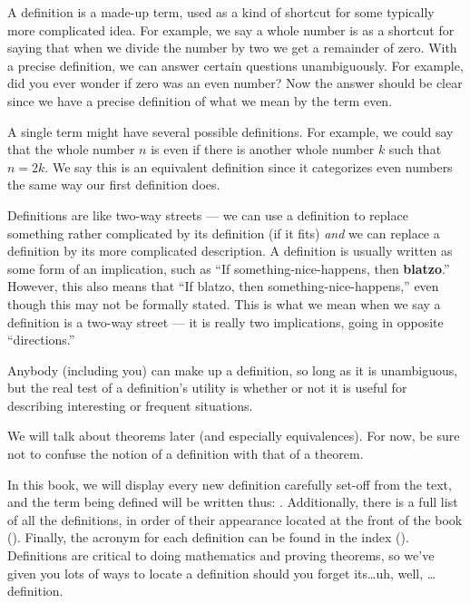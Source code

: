 \begin{para}A definition is a made-up term, used as a kind of shortcut for some typically more complicated idea.  For example, we say a whole number is  as a shortcut for saying that when we divide the number by two we get a remainder of zero.  With a precise definition, we can answer certain questions unambiguously.  For example, did you ever wonder if zero was an even number?  Now the answer should be clear since we have a precise definition of what we mean by the term even.\end{para}
%
\begin{para}A single term might have several possible definitions.  For example, we could say that the whole number $n$ is even if there is another whole number $k$ such that $n=2k$.  We say this is an equivalent definition since it categorizes even numbers the same way our first definition does.\end{para}
%
\begin{para}Definitions are like two-way streets --- we can use a definition to replace something rather complicated by its definition (if it fits) {\em and} we can replace a definition by its more complicated description.  A definition is usually written as some form of an implication, such as ``If something-nice-happens, then {\bf blatzo}.''  However, this also means that ``If blatzo, then something-nice-happens,'' even though this may not be formally stated.  This is what we mean when we say a definition is a two-way street --- it is really two implications, going in opposite ``directions.''\end{para}
%
\begin{para}Anybody (including you) can make up a definition, so long as it is unambiguous, but the real test of a definition's utility is whether or not it is useful for describing interesting or frequent situations.\end{para}
%
\begin{para}We will talk about theorems later (and especially equivalences).  For now, be sure not to confuse the notion of a definition with that of a theorem.\end{para}
%
\begin{para}In this book, we will display every new definition carefully set-off from the text, and the term being defined will be written thus: .  Additionally, there is a full list of all the definitions, in order of their appearance located at the front of the book ().  Finally, the acronym for each definition can be found in the index ().  Definitions are critical to doing mathematics and proving theorems, so we've given you lots of ways to locate a definition should you forget its\dots uh, well, \dots definition.\end{para}
